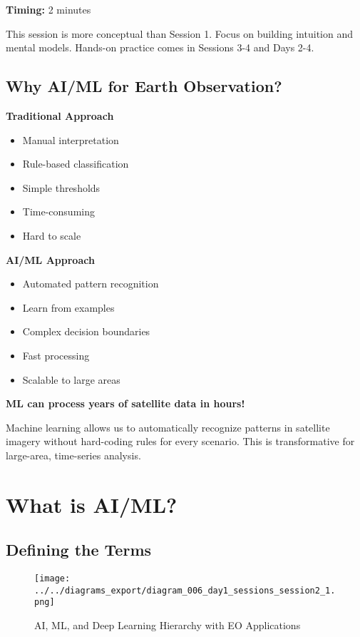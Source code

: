\documentclass[
  letterpaper,
  DIV=11,
  numbers=noendperiod]{scrartcl}
\providecommand{\tightlist}{%
  \setlength{\itemsep}{0pt}\setlength{\parskip}{0pt}}
\begin{document}
\textbf{Timing:} 2 minutes

This session is more conceptual than Session 1. Focus on building
intuition and mental models. Hands-on practice comes in Sessions 3-4 and
Days 2-4.

\subsection{Why AI/ML for Earth
Observation?}\label{why-aiml-for-earth-observation}

\textbf{Traditional Approach}

\begin{itemize}
\tightlist
\item
  Manual interpretation
\item
  Rule-based classification
\item
  Simple thresholds
\item
  Time-consuming
\item
  Hard to scale
\end{itemize}

\textbf{AI/ML Approach}

\begin{itemize}
\tightlist
\item
  Automated pattern recognition
\item
  Learn from examples
\item
  Complex decision boundaries
\item
  Fast processing
\item
  Scalable to large areas
\end{itemize}

\textbf{ML can process years of satellite data in hours!}

Machine learning allows us to automatically recognize patterns in
satellite imagery without hard-coding rules for every scenario. This is
transformative for large-area, time-series analysis.

\section{What is AI/ML?}\label{what-is-aiml}

\subsection{Defining the Terms}\label{defining-the-terms}

\begin{figure}[H]

{\centering \texttt{[image: ../../diagrams\_export/diagram\_006\_day1\_sessions\_session2\_1.png]}

}

\caption{AI, ML, and Deep Learning Hierarchy with EO Applications}

\end{figure}%
\end{document}
